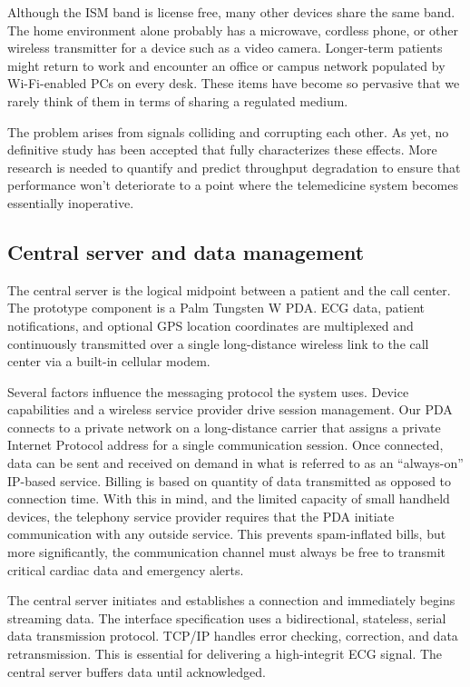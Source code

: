 \documentclass[a4paper,12pt]{article}
\begin{document}
Although the ISM band is license free, many other devices share the same band. The home environment alone probably has a microwave, cordless phone, or other wireless transmitter for a device such as a video camera. Longer-term patients might return to work and encounter an office or campus network populated by Wi-Fi-enabled PCs on every desk. These items have become so pervasive that we rarely think of them in terms of sharing a regulated medium.

The problem arises from signals colliding and corrupting each other. As yet, no definitive study has been accepted that fully characterizes these effects. More research is needed to quantify and predict throughput degradation to ensure that performance won’t deteriorate to a point where the telemedicine system becomes essentially inoperative.

\subsection{Central server and data management}


The central server is the logical midpoint between a patient and the call center. The prototype component is a Palm Tungsten W PDA. ECG data, patient notifications, and optional GPS location coordinates are multiplexed and continuously transmitted over a single long-distance wireless link to the call center via a built-in cellular modem.

Several factors influence the messaging protocol the system uses. Device capabilities and a wireless service provider drive session management. Our PDA connects to a private network on a long-distance carrier that assigns a private Internet Protocol address for a single communication session. Once connected, data can be sent and received on demand in what is referred to as an “always-on” IP-based service. Billing is based on quantity of data transmitted as opposed to connection time. With this in mind, and the limited capacity of small handheld devices, the telephony service provider requires that the PDA initiate communication with any outside service. This prevents spam-inflated bills, but more significantly, the communication channel must always be free to transmit critical cardiac data and emergency alerts.

The central server initiates and establishes a connection and immediately begins streaming data. The interface specification uses a bidirectional, stateless, serial data transmission protocol. TCP/IP handles error checking, correction, and data retransmission. This is essential for delivering a high-integrit ECG signal. The central server buffers data until acknowledged.
\end{document}
